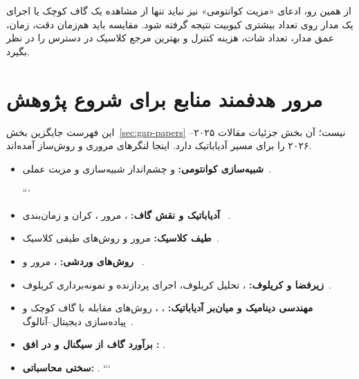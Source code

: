 از همین رو، ادعای «مزیت کوانتومی» نیز نباید تنها از مشاهده یک گاف کوچک یا اجرای یک مدار روی تعداد بیشتری کیوبیت نتیجه گرفته شود.
مقایسه باید هم‌زمان دقت، زمان، عمق مدار، تعداد شات، هزینه کنترل و بهترین مرجع کلاسیک در دسترس را در نظر بگیرد.

\section{مرور هدفمند منابع برای شروع پژوهش}

این فهرست جایگزین بخش~\ref{sec:gap-papers} نیست؛ آن بخش جزئیات مقالات ۲۰۲۵--۲۰۲۶ را برای مسیر آدیاباتیک دارد.
اینجا لنگرهای مروری و روش‌ساز آمده‌اند.

\begin{itemize}
	\item \textbf{شبیه‌سازی کوانتومی:}
	 و چشم‌انداز شبیه‌سازی و مزیت عملی~\cite{Georgescu2014,Daley2022,CiracZoller2012}.
	
	```
	\item \textbf{آدیاباتیک و نقش گاف:}
	، مرور ، کران  و زمان‌بندی ~\cite{Farhi2000,AlbashLidar2018,GapJansen2007,GapRoland2002}.
	
	\item \textbf{طیف کلاسیک:}
	مرور  و روش‌های طیفی کلاسیک~\cite{GapSchollwock2011,Cirac2021}.
	
	\item \textbf{روش‌های وردشی:}
	، مرور  و ~\cite{Peruzzo2014,Tilly2022,GapHiggott2019}.
	
	\item \textbf{زیرفضا و کریلوف:}
	، تحلیل کریلوف، اجرای پردازنده و نمونه‌برداری کریلوف~\cite{McClean2017QSE,Kirby2023Krylov,KrylovNatComm2025,GapYu2025}.
	
	\item \textbf{مهندسی دینامیک و میان‌بر آدیاباتیک:}
	، ، روش‌های مقابله با گاف کوچک و پیاده‌سازی دیجیتال--آنالوگ~\cite{Berry2009STA,GapSels2017,Gueneau2025CD,Kumar2024DACQO}.
	
	\item \textbf{برآورد گاف از سیگنال و در افق :}
	\cite{GapLee2025,GapCugini2025,GapCarrera2026}.
	
	\item \textbf{سختی محاسباتی:}
	\cite{GapGharibian2015,GapCubitt2015}.
	```
	
\end{itemize}

